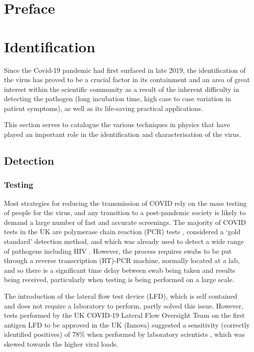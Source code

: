 \documentclass[11pt]{report}
\begin{document}
	\chapter{Preface}
	\chapter{Identification}

Since the Covid-19 pandemic had first surfaced in late 2019, the identification of the virus has proved to be a crucial factor in its containment and an area of great interest within the scientific community as a result of the inherent difficulty in detecting the pathogen (long incubation time, high case to case variation in patient symptoms), as well as its life-saving practical applications.

This section serves to catalogue the various techniques in physics that have played an important role in the identification and characterisation of the virus.

		\section{Detection}	


\subsection{Testing}
Most strategies for reducing the transmission of COVID rely on the mass testing of people for the virus, and any transition to a post-pandemic society is likely to demand a large number of fast and accurate screenings. The majority of COVID tests in the UK are polymerase chain reaction (PCR) tests \cite{testing1}, considered a ‘gold standard’ detection method, and which was already used to detect a wide range of pathogens including HIV \cite{testing2}. However, the process requires swabs to be put through a reverse transcription (RT)-PCR machine, normally located at a lab, and so there is a significant time delay between swab being taken and results being received, particularly when testing is being performed on a large scale.

The introduction of the lateral flow test device (LFD), which is self contained and does not require a laboratory to perform, partly solved this issue. However, tests performed by the UK COVID-19 Lateral Flow Oversight Team on the first antigen LFD to be approved in the UK (Innova) suggested a sensitivity (correctly identified positives) of 78\% when performed by laboratory scientists \cite{testing3}, which was skewed towards the higher viral loads. 
\end{document}
